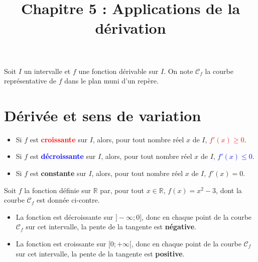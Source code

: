 \documentclass[11pt]{article}
\title{Chapitre 5 : Applications de la dérivation}
\date{}
\author{}
\newcommand{\Cf}{\mathscr C_{f}}
\begin{document}
\maketitle\thispagestyle{fancy}
Soit $I$ un intervalle et $f$ une fonction dérivable sur $I$. On note $\Cf$ la
courbe représentative de $f$ dans le plan muni d'un repère.
\section{Dérivée et sens de variation}
\noindent\begin{minipage}{.6\textwidth}
\begin{thm}
  \begin{itemize}
    \item Si $f$ est \textbf{\textcolor{red}{croissante}} sur $I$, alors, pour tout
      nombre réel $x$ de $I$, \textcolor{red}{$f'(x)\geq 0$}.
    \item Si $f$ est \textbf{\textcolor{blue}{décroissante}} sur $I$, alors, pour tout
      nombre réel $x$ de $I$, \textcolor{blue}{$f'(x)\leq 0$}.
    \item Si $f$ est \textbf{\textcolor{green!50!black}{constante}} sur $I$, alors, pour tout
      nombre réel $x$ de $I$, \textcolor{green!50!black}{$f'(x) = 0$}.
  \end{itemize}
\end{thm}
\begin{exemple}
    Soit $f$ la fonction définie sur $\mathbb{R}$ par, pour tout
    $x\in\mathbb{R}$, $f(x)=x^2-3$, dont la courbe $\Cf$ est donnée ci-contre.
    \begin{itemize}
    \item La fonction est décroissante sur $]-\infty; 0]$, donc en chaque point
        de la courbe $\Cf$ sur cet intervalle, la pente de la tangente est
        \textbf{négative}.
      \item La fonction est croissante sur $[0;+\infty[$, donc en chaque point
          de la courbe $\Cf$ sur cet intervalle, la pente de la tangente est
          \textbf{positive}.
    \end{itemize}
\end{exemple}
\end{minipage}
\begin{minipage}{.4\textwidth}
    \begin{center}
    \end{center}
  \end{minipage}
\end{document}

